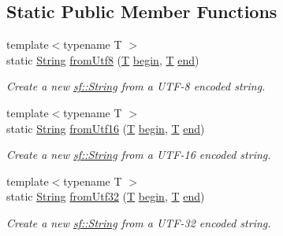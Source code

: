 \subsection*{Static Public Member Functions}
\begin{DoxyCompactItemize}
\item 
{\footnotesize template$<$typename T $>$ }\\static \hyperlink{classsf_1_1_string}{String} \hyperlink{classsf_1_1_string_aa7beb7ae5b26e63dcbbfa390e27a9e4b}{from\-Utf8} (\hyperlink{curses_8priv_8h_a5ef253115820acf7d27f3c5c3b02a0f0}{T} \hyperlink{classsf_1_1_string_a8ec30ddc08e3a6bd11c99aed782f6dfe}{begin}, \hyperlink{curses_8priv_8h_a5ef253115820acf7d27f3c5c3b02a0f0}{T} \hyperlink{classsf_1_1_string_ac823012f39cb6f61100418876e99d53b}{end})
\begin{DoxyCompactList}\small\item\em Create a new \hyperlink{classsf_1_1_string}{sf\-::\-String} from a U\-T\-F-\/8 encoded string. \end{DoxyCompactList}\item 
{\footnotesize template$<$typename T $>$ }\\static \hyperlink{classsf_1_1_string}{String} \hyperlink{classsf_1_1_string_a81f70eecad0000a4f2e4d66f97b80300}{from\-Utf16} (\hyperlink{curses_8priv_8h_a5ef253115820acf7d27f3c5c3b02a0f0}{T} \hyperlink{classsf_1_1_string_a8ec30ddc08e3a6bd11c99aed782f6dfe}{begin}, \hyperlink{curses_8priv_8h_a5ef253115820acf7d27f3c5c3b02a0f0}{T} \hyperlink{classsf_1_1_string_ac823012f39cb6f61100418876e99d53b}{end})
\begin{DoxyCompactList}\small\item\em Create a new \hyperlink{classsf_1_1_string}{sf\-::\-String} from a U\-T\-F-\/16 encoded string. \end{DoxyCompactList}\item 
{\footnotesize template$<$typename T $>$ }\\static \hyperlink{classsf_1_1_string}{String} \hyperlink{classsf_1_1_string_ab023a4900dce37ee71ab9e29b30a23cb}{from\-Utf32} (\hyperlink{curses_8priv_8h_a5ef253115820acf7d27f3c5c3b02a0f0}{T} \hyperlink{classsf_1_1_string_a8ec30ddc08e3a6bd11c99aed782f6dfe}{begin}, \hyperlink{curses_8priv_8h_a5ef253115820acf7d27f3c5c3b02a0f0}{T} \hyperlink{classsf_1_1_string_ac823012f39cb6f61100418876e99d53b}{end})
\begin{DoxyCompactList}\small\item\em Create a new \hyperlink{classsf_1_1_string}{sf\-::\-String} from a U\-T\-F-\/32 encoded string. \end{DoxyCompactList}\item 

\end{DoxyCompactItemize}
